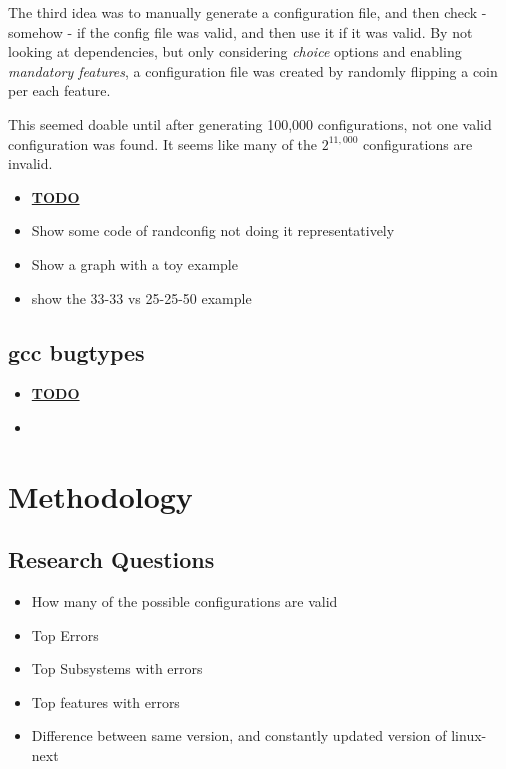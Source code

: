 \documentclass[a4paper,11pt]{article}
\begin{document}
The third idea was to manually generate a configuration file, and then check - 
somehow - if the config file was valid, and then use it if it was valid. By 
not looking at dependencies, but only considering \emph{choice} options and 
enabling \emph{mandatory features}, a configuration file was created by 
randomly flipping a coin per each feature.

This seemed doable until after generating 100,000 configurations, not one 
valid configuration was found. It seems like many of the $2^{11,000}$ 
configurations are invalid.


\begin{itemize}
    \item \underline{\textbf{TODO}}
    \item Show some code of randconfig not doing it representatively
    \item Show a graph with a toy example
    \item show the 33-33 vs 25-25-50 example
\end{itemize}


\subsection{gcc bugtypes}

\begin{itemize}
    \item \underline{\textbf{TODO}}
    \item 
\end{itemize}


\newpage
\section{Methodology}

\subsection{Research Questions}

\begin{itemize}
    \item How many of the possible configurations are valid
    \item Top Errors
    \item Top Subsystems with errors
    \item Top features with errors
    \item Difference between same version, and constantly updated version of 
        linux-next
\end{itemize}
\end{document}
